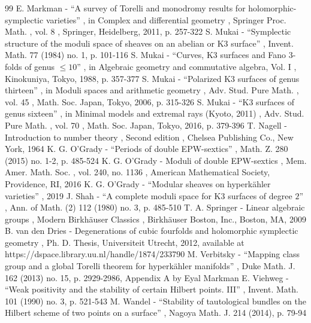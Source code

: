 \documentclass[11pt]{article}
\begin{document}
\begin{thebibliography}{99}
 E. Markman - “A survey of Torelli and monodromy results for holomorphic-symplectic varieties” , in Complex and differential geometry , Springer Proc. Math. , vol. 8 , Springer, Heidelberg, 2011, p. 257-322
 S. Mukai - “Symplectic structure of the moduli space of sheaves on an abelian or K3 surface” , Invent. Math. 77 (1984) no. 1, p. 101-116
 S. Mukai - “Curves, K3 surfaces and Fano $3$-folds of genus $\le 10$” , in Algebraic geometry and commutative algebra, Vol. I , Kinokuniya, Tokyo, 1988, p. 357-377
 S. Mukai - “Polarized K3 surfaces of genus thirteen” , in Moduli spaces and arithmetic geometry , Adv. Stud. Pure Math. , vol. 45 , Math. Soc. Japan, Tokyo, 2006, p. 315-326
 S. Mukai - “K3 surfaces of genus sixteen” , in Minimal models and extremal rays (Kyoto, 2011) , Adv. Stud. Pure Math. , vol. 70 , Math. Soc. Japan, Tokyo, 2016, p. 379-396
 T. Nagell - Introduction to number theory , Second edition , Chelsea Publishing Co., New York, 1964
 K. G. O’Grady - “Periods of double EPW-sextics” , Math. Z. 280 (2015) no. 1-2, p. 485-524
 K. G. O’Grady - Moduli of double EPW-sextics , Mem. Amer. Math. Soc. , vol. 240, no. 1136 , American Mathematical Society, Providence, RI, 2016
 K. G. O’Grady - “Modular sheaves on hyperkähler varieties” , 2019
 J. Shah - “A complete moduli space for K3 surfaces of degree $2$” , Ann. of Math. (2) 112 (1980) no. 3, p. 485-510
 T. A. Springer - Linear algebraic groups , Modern Birkhäuser Classics , Birkhäuser Boston, Inc., Boston, MA, 2009
 B. van den Dries - Degenerations of cubic fourfolds and holomorphic symplectic geometry , Ph. D. Thesis, Universiteit Utrecht, 2012, available at https://dspace.library.uu.nl/handle/1874/233790
 M. Verbitsky - “Mapping class group and a global Torelli theorem for hyperkähler manifolds” , Duke Math. J. 162 (2013) no. 15, p. 2929-2986, Appendix A by Eyal Markman
 E. Viehweg - “Weak positivity and the stability of certain Hilbert points. III” , Invent. Math. 101 (1990) no. 3, p. 521-543
 M. Wandel - “Stability of tautological bundles on the Hilbert scheme of two points on a surface” , Nagoya Math. J. 214 (2014), p. 79-94
\end{thebibliography}
\end{document}
